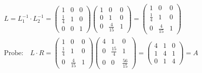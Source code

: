 \begin{align*}
  & L = L_1^{-1} \cdot L_2^{-1} =
  \begin{pmatrix} 1 & 0 & 0 \\ \frac{1}{4} & 1 & 0 \\ 0 & 0 & 1\end{pmatrix}
  \begin{pmatrix} 1 & 0 & 0 \\ 0 & 1 & 0 \\ 0 & \frac{4}{15}  & 1\end{pmatrix}
  =   \begin{pmatrix} 1 & 0 & 0 \\ \frac{1}{4} & 1 & 0 \\ 0 & \frac{4}{15} & 1\end{pmatrix}\\
& \text{Probe:}\quad L \cdot R =
\begin{pmatrix} 1 & 0 & 0 \\ \frac{1}{4} & 1 & 0 \\ 0 & \frac{4}{15} & 1\end{pmatrix}
\begin{pmatrix} 4 & 1 & 0 \\ 0 & \frac{15}{4} & 1 \\ 0 & 0 & \frac{56}{15} \end{pmatrix} =
\begin{pmatrix} 4 & 1 & 0 \\ 1 & 4 & 1 \\ 0 & 1 & 4 \end{pmatrix} = A
\end{align*}

